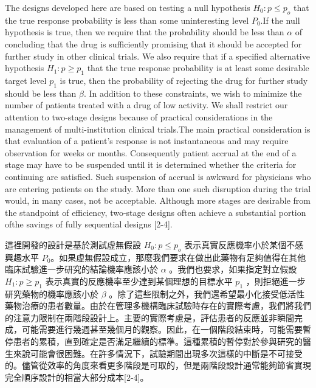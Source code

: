 	The designs developed here are based on testing a null hypothesis $H_0:p \leq p_o$ that the true response probability is less than some uninteresting level $P_0$.If the null hypothesis is true, then we require that the probability should be less than $\alpha$ of concluding that the drug is sufficiently promising that it should be accepted for further study in other clinical trials. We also require that if a specified alternative hypothesis $H_1:p \geq p_1$ that the true response probability is at least some desirable target level $p_1$ is true, then the probability of rejecting the drug for further study should be less than $\beta$. In addition to these constraints, we wish to minimize the number of patients treated with a drug of low activity. We shall restrict our attention to two-stage designs because of practical considerations in the management of multi-institution clinical trials.The main practical consideration is that evaluation of a patient's response is not instantaneous and may require observation for weeks or months. Consequently patient accrual at the end of a stage may have to be suspended until it is determined whether the criteria for continuing are satisfied. Such suspension of accrual is awkward for physicians who are entering patients on the study. More than one such disruption during the trial would, in many cases, not be acceptable. Although more stages are desirable from the standpoint of efficiency, two-stage designs often achieve a substantial portion ofthe savings of fully sequential designs [2-4]. 

	這裡開發的設計是基於測試虛無假設 $H_0:p \leq p_o$ 表示真實反應機率小於某個不感興趣水平 $P_0$。如果虛無假設成立，那麼我們要求在做出此藥物有足夠值得在其他臨床試驗進一步研究的結論機率應該小於 $\alpha$ 。我們也要求，如果指定對立假設 $H_1:p \geq p_1$ 表示真實的反應機率至少達到某個理想的目標水平 $p_1$ ，則拒絕進一步研究藥物的機率應該小於 $\beta$ 。除了這些限制之外，我們還希望最小化接受低活性藥物治療的患者數量。由於在管理多機構臨床試驗時存在的實際考慮，我們將我們的注意力限制在兩階段設計上。主要的實際考慮是，評估患者的反應並非瞬間完成，可能需要進行幾週甚至幾個月的觀察。因此，在一個階段結束時，可能需要暫停患者的累積，直到確定是否滿足繼續的標準。這種累積的暫停對於參與研究的醫生來說可能會很困難。在許多情況下，試驗期間出現多次這樣的中斷是不可接受的。儘管從效率的角度來看更多階段是可取的，但是兩階段設計通常能夠節省實現完全順序設計的相當大部分成本[2-4]。
	

